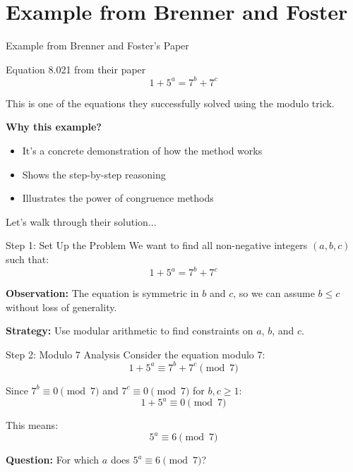 \section{Example from Brenner and Foster}

\begin{frame}{Example from Brenner and Foster's Paper}
    \begin{block}{Equation 8.021 from their paper}
        \[1 + 5^a = 7^b + 7^c\]
    \end{block}
    
    \vspace{0.3cm}
    This is one of the equations they successfully solved using the modulo trick.
    
    \textbf{Why this example?}
    \begin{itemize}
        \item It's a concrete demonstration of how the method works
        \item Shows the step-by-step reasoning
        \item Illustrates the power of congruence methods
    \end{itemize}
    
    \vspace{0.2cm}
    Let's walk through their solution...
\end{frame}

\begin{frame}{Step 1: Set Up the Problem}
    We want to find all non-negative integers $(a,b,c)$ such that:
    \[1 + 5^a = 7^b + 7^c\]
    
    \vspace{0.3cm}
    \textbf{Observation:} The equation is symmetric in $b$ and $c$, so we can assume $b \leq c$ without loss of generality.
    
    \textbf{Strategy:} Use modular arithmetic to find constraints on $a$, $b$, and $c$.
\end{frame}

\begin{frame}{Step 2: Modulo 7 Analysis}
    Consider the equation modulo 7:
    \[1 + 5^a \equiv 7^b + 7^c \pmod 7\]
    
    Since $7^b \equiv 0 \pmod 7$ and $7^c \equiv 0 \pmod 7$ for $b,c \geq 1$:
    \[1 + 5^a \equiv 0 \pmod 7\]
    
    This means:
    \[5^a \equiv 6 \pmod 7\]
    
    \textbf{Question:} For which $a$ does $5^a \equiv 6 \pmod 7$?
\end{frame}

